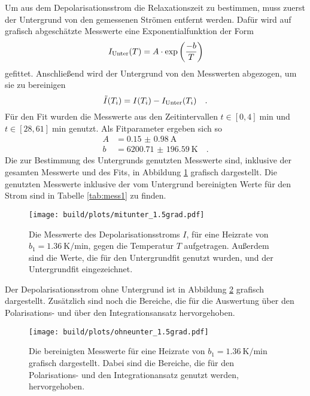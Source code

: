 \noindent
Um aus dem Depolarisationsstrom die Relaxationszeit zu bestimmen, muss zuerst der Untergrund von den gemessenen Strömen entfernt werden.
Dafür wird auf grafisch abgeschätzte Messwerte eine Exponentialfunktion der Form
\begin{equation}
  I_{\text{Unter}}(T) = A\cdot \exp\left(\frac{-b}{T}\right)
  \label{eqn:exp}
\end{equation}
gefittet. Anschließend wird der Untergrund von den Messwerten abgezogen, um sie zu bereinigen
\begin{equation*}
  \tilde{I}(T_i) = I(T_i) - I_{\text{Unter}}(T_i) \quad.
\end{equation*}
Für den Fit wurden die Messwerte aus den Zeitintervallen $t \in [0,4] \; \si{\minute}$ und $t \in [28,61] \; \si{\minute}$ genutzt.
Als Fitparameter ergeben sich so 
\begin{align*}
  A &= \SI{0.15(098)}{\ampere}\\
  b &= \SI{6200.71(19659)}{\kelvin} \quad .
\end{align*}
Die zur Bestimmung des Untergrunds genutzten Messwerte sind,
inklusive der gesamten Messwerte und des Fits, in Abbildung \ref{img:mitunter15} grafisch dargestellt. 
Die genutzten Messwerte inklusive der vom Untergrund bereinigten Werte für den Strom sind in Tabelle \ref{tab:mess1} zu finden.
\begin{figure}[h]
  \centering
  \texttt{[image: build/plots/mitunter\_1.5grad.pdf]}
  \caption{Die Messwerte des Depolarisationsstroms $I$, für eine Heizrate von $b_1 = \SI{1.36}{\kelvin\per\minute}$, gegen die Temperatur $T$ aufgetragen. 
  Außerdem sind die Werte, die für den Untergrundfit genutzt wurden, und der Untergrundfit eingezeichnet.}
  \label{img:mitunter15}
\end{figure}

\noindent
Der Depolarisationsstrom ohne Untergrund ist in Abbildung \ref{img:ohneunter15} grafisch dargestellt. 
Zusätzlich sind noch die Bereiche, die für die Auswertung über den Polarisations- und über den Integrationsansatz hervorgehoben.
\begin{figure}[H]
  \centering
  \texttt{[image: build/plots/ohneunter\_1.5grad.pdf]}
  \caption{Die bereinigten Messwerte für eine Heizrate von $b_1 = \SI{1.36}{\kelvin\per\minute}$ grafisch dargestellt.
          Dabei sind die Bereiche, die für den Polarisations- und den Integrationansatz genutzt werden, hervorgehoben.}
  \label{img:ohneunter15}
\end{figure}

